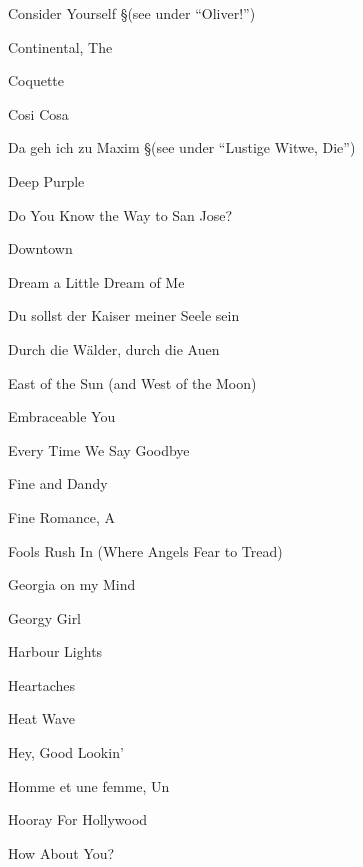 \N Consider Yourself
\nobreak
\S (see under ``Oliver!'')

\N Continental, The

\N Coquette

\N Cosi Cosa

\N Da geh ich zu Maxim
\nobreak
\S (see under ``Lustige Witwe, Die'')

\N Deep Purple

\N Do You Know the Way to San Jose?

\N Downtown

\N Dream a Little Dream of Me

\N Du sollst der Kaiser meiner Seele sein

\N Durch die W{\"a}lder, durch die Auen

\N East of the Sun (and West of the Moon)

\N Embraceable You

\N Every Time We Say Goodbye

\N Fine and Dandy

\N Fine Romance, A

\N Fools Rush In (Where Angels Fear to Tread)

\N Georgia on my Mind

\N Georgy  Girl

\N Harbour Lights

\N Heartaches

\N Heat Wave

\N Hey, Good Lookin'

\N Homme et une femme, Un

\N Hooray For Hollywood

\N How About You?

\singlecolumn


\bye
